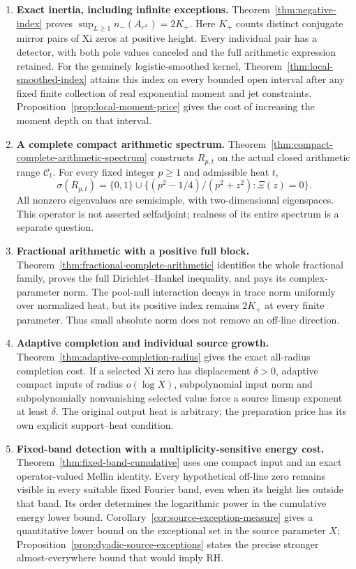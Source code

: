 \documentclass[11pt]{article}
\theoremstyle{remark}\newtheorem{remark}[theorem]{Remark}
\begin{document}
\begin{enumerate}
\item \textbf{Exact inertia, including infinite exceptions.}
Theorem~\ref{thm:negative-index} proves
\(\sup_{L\ge1}n_-(A_{e^L})=2K_+\). Here \(K_+\) counts distinct
conjugate mirror pairs of Xi zeros at positive height. Every
individual pair has a detector, with both pole values canceled and
the full arithmetic expression retained. For the genuinely
logistic-smoothed kernel, Theorem~\ref{thm:local-smoothed-index}
attains this index on every bounded open interval after any fixed
finite collection of real exponential moment and jet constraints.
Proposition~\ref{prop:local-moment-price} gives the cost of
increasing the moment depth on that interval.

\item \textbf{A complete compact arithmetic spectrum.}
Theorem~\ref{thm:compact-complete-arithmetic-spectrum} constructs
\(R_{p,t}\) on the actual closed arithmetic range \(\mathcal C_t\).
For every fixed integer \(p\ge1\) and admissible heat \(t\),
\[
 \sigma(R_{p,t})=\{0,1\}\cup
  \{(p^2-1/4)/(p^2+z^2):\Xi(z)=0\}.
\]
All nonzero eigenvalues are semisimple, with two-dimensional
eigenspaces. This operator is not asserted selfadjoint; realness
of its entire spectrum is a separate question.

\item \textbf{Fractional arithmetic with a positive full block.}
Theorem~\ref{thm:fractional-complete-arithmetic} identifies the
whole fractional family, proves the full Dirichlet--Hankel
inequality, and pays its complex-parameter norm. The pool-null
interaction decays in trace norm uniformly over normalized heat,
but its positive index remains \(2K_+\) at every finite parameter.
Thus small absolute norm does not remove an off-line direction.

\item \textbf{Adaptive completion and individual source growth.}
Theorem~\ref{thm:adaptive-completion-radius} gives the exact
all-radius completion cost. If a selected Xi zero has displacement
\(\delta>0\), adaptive compact inputs of radius \(o(\log X)\),
subpolynomial input norm and subpolynomially nonvanishing selected
value force a source limsup exponent at least \(\delta\).
The original output heat is arbitrary; the preparation price has
its own explicit support--heat condition.

\item \textbf{Fixed-band detection with a multiplicity-sensitive energy cost.}
Theorem~\ref{thm:fixed-band-cumulative} uses one compact input
and an exact operator-valued Mellin identity. Every hypothetical
off-line zero remains visible in every suitable fixed Fourier band,
even when its height lies outside that band. Its order determines
the logarithmic power in the cumulative energy lower bound.
Corollary~\ref{cor:source-exception-measure} gives a quantitative
lower bound on the exceptional set in the source parameter \(X\);
Proposition~\ref{prop:dyadic-source-exceptions} states the precise
stronger almost-everywhere bound that would imply RH.


\end{enumerate}
\end{document}
